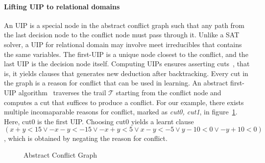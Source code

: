 \paragraph {\textbf{Lifting UIP to relational domains}}
An UIP is a special node in the abstract conflict graph such that 
any path from the last decision node to the conflict node must pass 
through it.  Unlike a SAT solver, a UIP for relational domain may 
involve meet irreducibles that contains the same variables.  The 
first-UIP is a unique node closest to the conflict, and the last UIP 
is the decision node itself.  Computing UIPs ensures asserting
cuts~\cite{cdcl,DBLP:journals/fmsd/BrainDGHK14}, that is, it 
yields clauses that generates new deduction after backtracking.  
Every cut in the graph is a reason for conflict that can be 
used in learning.  An abstract first-UIP algorithm~\cite{DBLP:journals/fmsd/BrainDGHK14} 
traverses the trail $\mathcal{T}$ starting from the conflict node and 
computes a cut that suffices to produce a conflict. 
For our example, there exists multiple incomaparable reasons for conflict,
marked as {\em cut0, cut1}, in figure~\ref{conflict}.  Here, cut0 is the first UIP.  
Choosing cut0 yields a learnt clause 
$(x+y<15 \vee -x-y<-15 \vee -x+y<5 \vee x-y<-5 \vee y-10<0 \vee -y+10<0)$, 
which is obtained by negating the reason for conflict.  
%
\begin{figure}[t]
\caption{\label{conflict} Abstract Conflict Graph }
\end{figure} 
%    
